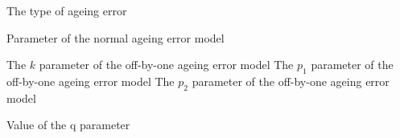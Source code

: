 {The type of ageing error}
\par\textbf{}\par
\par\textbf{}\par
{} {Parameter of the normal ageing error model}
\par\textbf{}\par
{} {The $k$ parameter of the off-by-one ageing error model}
 {The $p_1$ parameter of the off-by-one ageing error model}
 {The $p_2$ parameter of the off-by-one ageing error model}
\par {}\par
{} {Value of the q parameter}
